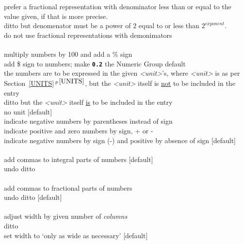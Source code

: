 \documentclass[12pt]{article}
\newcommand{\TT}[1]{{\tt \bfseries #1}}
\newcommand{\itemref}[1]{\ref{#1}$\,^{p\,\pageref{#1}}$}
\newcommand{\CIRCUM}{\textasciicircum}
\begin{document}
    prefer a fractional representation with denominator less than
    or equal to the value given, if that is more precise. \\
\GROUPENTRY[\em <exponent>]{f2\CIRCUM}
    ditto but denomenator must be a power of $2$ equal to or less
    than $2^{exponent}$. \\
    do not use fractional representations with demonimators
    \GROUPNEWLINE
    [default] \\
\ENDGROUP \\
 multiply numbers by 100 and add a \% sign \\
 add \$ sign to numbers; \GROUPNEWLINE
                make \TT{0.2} the Numeric Group default \\
\GROUPENTRY[\TT{`}\em <unit>\TT{'}]{u} the numbers are to be expressed in
		the given {\em <unit>}'s, where {\em <unit>} is as per
		Section~\itemref{UNITS}, but the {\em <unit>} itself
		is \underline{not} to be included in the entry\\
\GROUPENTRY[\TT{`}\em <unit>\TT{'}]{U} ditto but
		the {\em <unit>} itself
		\underline{is} to be included in the entry\\
 no unit [default]
\ENDGROUP \\
 indicate negative numbers by parentheses instead of sign \\
 indicate positive and zero numbers by sign, + or - \\
 indicate negative numbers by sign (-) and positive by absence
               of sign [default] \\
\ENDGROUP \\
 add commas to integral parts of numbers [default] \\
 undo ditto \\
\ENDGROUP \\
 add commas to fractional parts of numbers \\
 undo ditto [default] \\
\ENDGROUP \\
    adjust width by given number of {\em columns} \\
\GROUPENTRY[\em <columns>]{}
    ditto \\
    set width to `only as wide as necessary' [default] \\
\end{document}
